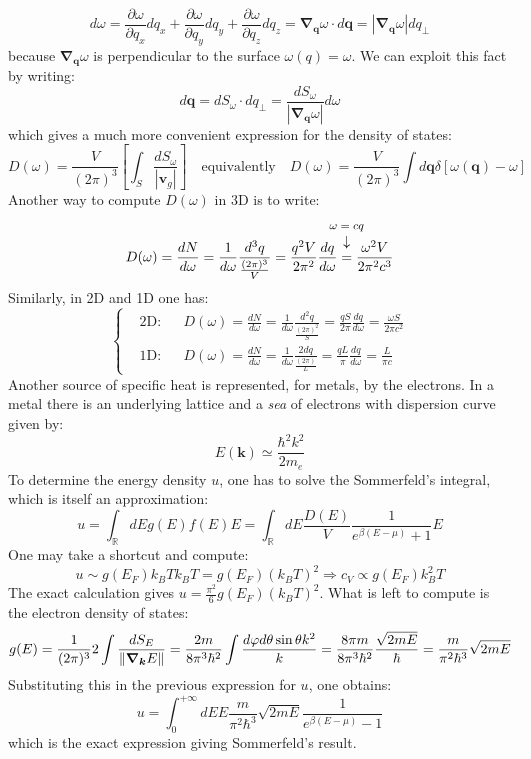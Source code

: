 \documentclass[10.75pt,a4paper,openright,bottom=2cm]{article}
\renewcommand{\Vec}[1]{\boldsymbol{#1}}
\begin{document}
\[
d\omega=\frac{\partial\omega}{\partial q_x}dq_x+\frac{\partial\omega}{\partial q_y}dq_y+\frac{\partial\omega}{\partial q_z}dq_z=\Vec{\nabla}_{\Vec{q}}\omega\cdot d\Vec{q}=|\Vec{\nabla}_{\Vec{q}}\omega|dq_\perp
\]
because $\Vec{\nabla}_{\Vec{q}}\omega$ is perpendicular to the surface $\omega(q)=\omega$. We can exploit this fact by writing: 
\[
d\Vec{q}=dS_\omega\cdot dq_\perp=\frac{dS_\omega}{|\Vec{\nabla}_{\Vec{q}}\omega|}d\omega
\]
which gives a much more convenient expression for the density of states:
\[
D(\omega)=\frac{V}{(2\pi)^3}\left[\int_S\frac{dS_\omega}{|\Vec{v}_g|}\right] \quad \text{equivalently} \quad D(\omega)=\frac{V}{(2\pi)^3}\int d\Vec{q}\delta[\omega(\Vec{q})-\omega]
\]
Another way to compute $D(\omega)$ in 3D is to write:
\[
D(\omega)=\frac{dN}{d\omega}=\frac{1}{d\omega}\frac{d^3q}{\frac{(2\pi)^3}{V}}=\frac{q^2V}{2\pi^2}\frac{dq}{d\omega}\overset{\mathclap{\tikz \node {$\downarrow$} node [above=1ex] {\footnotesize $\omega=cq$};}}{=}\frac{\omega^2V}{2\pi^2c^3}
\]
Similarly, in 2D and 1D one has:
\[
\left\{
\begin{aligned}
&\text{2D:} &&D(\omega)=\frac{dN}{d\omega}=\frac{1}{d\omega}\frac{d^2q}{\frac{(2\pi)^2}{S}}=\frac{qS}{2\pi}\frac{dq}{d\omega}=\frac{\omega S}{2\pi c^2}\\
&\text{1D:} &&D(\omega)=\frac{dN}{d\omega}=\frac{1}{d\omega}\frac{2dq}{\frac{(2\pi)}{L}}=\frac{qL}{\pi}\frac{dq}{d\omega}=\frac{L}{\pi c}
\end{aligned}
\right.
\]
Another source of specific heat is represented, for metals, by the electrons. In a metal there is an underlying lattice and a \textit{sea} of electrons with dispersion curve given by:
\[
E(\Vec{k})\simeq\frac{\hbar^2k^2}{2m_e}
\]
To determine the energy density $u$, one has to solve the Sommerfeld's integral, which is itself an approximation:
\[
u=\int_\mathbb{R}dEg(E)f(E)E=\int_\mathbb{R}dE\frac{D(E)}{V}\frac{1}{e^{\beta(E-\mu)}+1}E
\]
One may take a shortcut and compute:
\[
u\sim g(E_F)k_BTk_BT=g(E_F)(k_BT)^2\Rightarrow c_V\propto g(E_F)k_B^2T
\]
The exact calculation gives $u=\frac{\pi^2}{6}g(E_F)(k_BT)^2$. What is left to compute is the electron density of states:
\begin{equation}
\label{density}
g(E)=\frac{1}{(2\pi)^3}2\int\frac{dS_E}{\norm{\Vec{\nabla}_{\Vec{k}}E}}=\frac{2 m}{8\pi^3\hbar^2}\int\frac{d\varphi d\theta\sin\theta k^2}{k}=\frac{8\pi m}{8\pi^3\hbar^2}\frac{\sqrt{2mE}}{\hbar}=\frac{m}{\pi^2\hbar^3}\sqrt{2mE}
\end{equation}
Substituting this in the previous expression for $u$, one obtains:
\[
u=\int_0^{+\infty}dEE\frac{m}{\pi^2\hbar^3}\sqrt{2mE}\frac{1}{e^{\beta(E-\mu)}-1}
\]
which is the exact expression giving Sommerfeld's result.
\newpage
\end{document}
